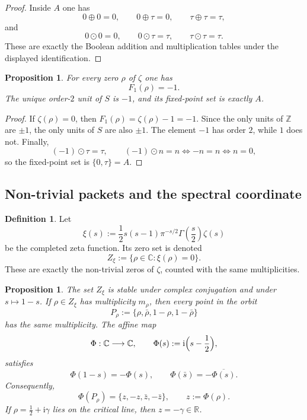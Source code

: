 \documentclass[11pt,a4paper]{article}
\numberwithin{equation}{section}
\newtheorem{proposition}[theorem]{Proposition}
\theoremstyle{definition}
\newtheorem{definition}[theorem]{Definition}
\theoremstyle{remark}
\newcommand{\ZZ}{\mathbb Z}
\newcommand{\RR}{\mathbb R}
\newcommand{\CC}{\mathbb C}
\newcommand{\taup}{\tau}
\newcommand{\ii}{\mathrm i}
\begin{document}
\begin{proof}
Inside $A$ one has
\[
0\oplus0=0,
\qquad
0\oplus\taup=0,
\qquad
\taup\oplus\taup=\taup,
\]
and
\[
0\odot0=0,
\qquad
0\odot\taup=\taup,
\qquad
\taup\odot\taup=\taup.
\]
These are exactly the Boolean addition and multiplication tables under the displayed identification.
\end{proof}

\begin{proposition}\label{P4:prop:F1-zero}
For every zero $\rho$ of $\zeta$ one has
\[
F_1(\rho)=-1.
\]
The unique order-$2$ unit of $S$ is $-1$, and its fixed-point set is exactly $A$.
\end{proposition}

\begin{proof}
If $\zeta(\rho)=0$, then $F_1(\rho)=\zeta(\rho)-1=-1$.  Since the only units of $\ZZ$ are $\pm1$, the only units of $S$ are also $\pm1$.  The element $-1$ has order $2$, while $1$ does not.  Finally,
\[
(-1)\odot\taup=\taup,
\qquad
(-1)\odot n=n\iff -n=n\iff n=0,
\]
so the fixed-point set is $\{0,\taup\}=A$.
\end{proof}

\subsection{Non-trivial packets and the spectral coordinate}

\begin{definition}
Let
\[
\xi(s):=\frac12 s(s-1)\pi^{-s/2}\Gamma\!\left(\frac s2\right)\zeta(s)
\]
be the completed zeta function.  Its zero set is denoted
\[
Z_\xi:=\{\rho\in\CC:\xi(\rho)=0\}.
\]
These are exactly the non-trivial zeros of $\zeta$, counted with the same multiplicities.
\end{definition}

\begin{proposition}\label{P4:prop:packet-coordinate}
The set $Z_\xi$ is stable under complex conjugation and under $s\mapsto 1-s$.  If $\rho\in Z_\xi$ has multiplicity $m_\rho$, then every point in the orbit
\[
P_\rho:=\{\rho,\bar\rho,1-\rho,1-\bar\rho\}
\]
has the same multiplicity.  The affine map
\[
\Phi:\CC\longrightarrow \CC,
\qquad
\Phi(s):=\ii\Bigl(s-\frac12\Bigr),
\]
satisfies
\[
\Phi(1-s)=-\Phi(s),
\qquad
\Phi(\bar s)=-\overline{\Phi(s)}.
\]
Consequently,
\[
\Phi(P_\rho)=\{z,-z,\bar z,-\bar z\},
\qquad z:=\Phi(\rho).
\]
If $\rho=\tfrac12+\ii\gamma$ lies on the critical line, then $z=-\gamma\in\RR$.
\end{proposition}
\end{document}
